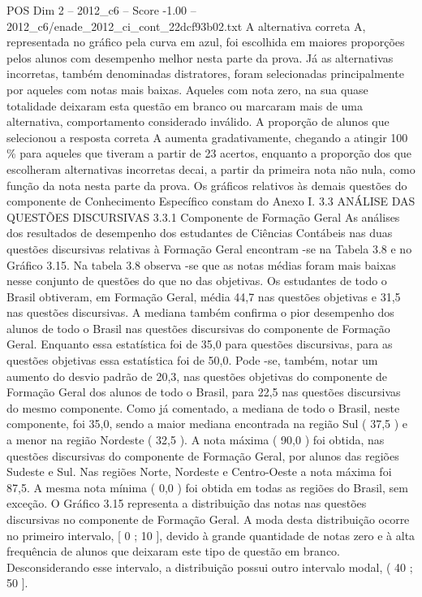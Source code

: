 \begin{textsample}{POS Dim 2 – 2012\_c6 – Score -1.00 – 2012\_c6/enade\_2012\_ci\_cont\_22dcf93b02.txt}
A alternativa correta A, representada no gráfico pela curva em azul, foi escolhida em maiores proporções pelos alunos com desempenho melhor nesta parte da prova.
Já as alternativas incorretas, também denominadas distratores, foram selecionadas principalmente por aqueles com notas mais baixas.
Aqueles com nota zero, na sua quase totalidade deixaram esta questão em branco ou marcaram mais de uma alternativa, comportamento considerado inválido.
A proporção de alunos que selecionou a resposta correta A aumenta gradativamente, chegando a atingir 100 \% para aqueles que tiveram a partir de 23 acertos, enquanto a proporção dos que escolheram alternativas incorretas decai, a partir da primeira nota não nula, como função da nota nesta parte da prova.
Os gráficos relativos às demais questões do componente de Conhecimento Específico constam do Anexo I. 3.3 ANÁLISE DAS QUESTÕES DISCURSIVAS 3.3.1 Componente de Formação Geral As análises dos resultados de desempenho dos estudantes de Ciências Contábeis nas duas questões discursivas relativas à Formação Geral encontram -se na Tabela 3.8 e no Gráfico 3.15.
Na tabela 3.8 observa -se que as notas médias foram mais baixas nesse conjunto de questões do que no das objetivas.
Os estudantes de todo o Brasil obtiveram, em Formação Geral, média 44,7 nas questões objetivas e 31,5 nas questões discursivas.
A mediana também confirma o pior desempenho dos alunos de todo o Brasil nas questões discursivas do componente de Formação Geral.
Enquanto essa estatística foi de 35,0 para questões discursivas, para as questões objetivas essa estatística foi de 50,0.
Pode -se, também, notar um aumento do desvio padrão de 20,3, nas questões objetivas do componente de Formação Geral dos alunos de todo o Brasil, para 22,5 nas questões discursivas do mesmo componente.
Como já comentado, a mediana de todo o Brasil, neste componente, foi 35,0, sendo a maior mediana encontrada na região Sul ( 37,5 ) e a menor na região Nordeste ( 32,5 ).
A nota máxima ( 90,0 ) foi obtida, nas questões discursivas do componente de Formação Geral, por alunos das regiões Sudeste e Sul.
Nas regiões Norte, Nordeste e Centro-Oeste a nota máxima foi 87,5.
A mesma nota mínima ( 0,0 ) foi obtida em todas as regiões do Brasil, sem exceção.
O Gráfico 3.15 representa a distribuição das notas nas questões discursivas no componente de Formação Geral.
A moda desta distribuição ocorre no primeiro intervalo, [ 0 ; 10 ], devido à grande quantidade de notas zero e à alta frequência de alunos que deixaram este tipo de questão em branco.
Desconsiderando esse intervalo, a distribuição possui outro intervalo modal, ( 40 ; 50 ].

\end{textsample}
